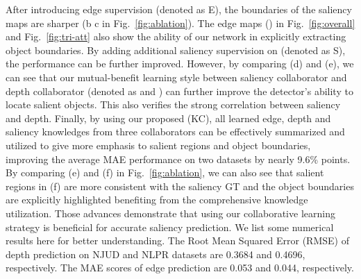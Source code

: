 \documentclass[runningheads]{llncs}
\begin{document}
After introducing edge supervision (denoted as E), the boundaries of the saliency maps are sharper (b  c in Fig.~\ref{fig:ablation}).
The edge maps () in Fig.~\ref{fig:overall} and Fig.~\ref{fig:tri-att} also show the ability of our network in explicitly extracting object boundaries.
By adding additional saliency supervision on  (denoted as S), the performance can be further improved.
However, by comparing (d) and (e), we can see that our mutual-benefit learning style between saliency collaborator and depth collaborator (denoted as  and ) can further improve the detector's ability to locate salient objects.
This also verifies the strong correlation between saliency and depth.
Finally, by using our proposed (KC), all learned edge, depth and saliency knowledges from three collaborators can be effectively summarized and utilized to give more emphasis to salient regions and object boundaries, improving the average MAE performance on two datasets by nearly 9.6\% points.
By comparing (e) and (f) in Fig.~\ref{fig:ablation}, we can also see that salient regions in (f) are more consistent with the saliency GT and the object boundaries are explicitly highlighted benefiting from the comprehensive knowledge utilization.
Those advances demonstrate that using our collaborative learning strategy is beneficial for accurate saliency prediction.
We list some numerical results here for better understanding. The Root Mean Squared Error (RMSE) of depth prediction on NJUD and NLPR datasets are 0.3684 and 0.4696, respectively.
The MAE scores of edge prediction are 0.053 and 0.044, respectively.
\end{document}
